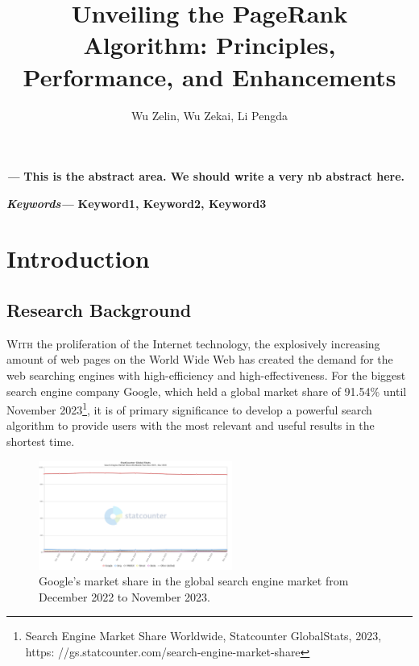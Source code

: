 \documentclass[lettersize,journal,12pt]{IEEEtran}
\renewenvironment{abstract}
{\fontsize{12}{14}\textit{\textbf{\abstractname---}}\bfseries\ignorespaces}
{}
\renewenvironment{IEEEkeywords}
{\fontsize{12}{14}\textit{\textbf{Keywords---}}\bfseries\ignorespaces}{}
\begin{document}
\onehalfspacing
\title{Unveiling the PageRank Algorithm: Principles, Performance, and Enhancements}
\author{Wu Zelin, Wu Zekai, Li Pengda}

\maketitle\thispagestyle{headings}
%

\begin{abstract}
	This is the abstract area. We should write a very nb abstract here.
\end{abstract}

\begin{IEEEkeywords}
	Keyword1, Keyword2, Keyword3
\end{IEEEkeywords}


\section{Introduction}

\subsection{Research Background}

\lettrine{W}{ith} 
the proliferation of the Internet technology, the explosively increasing amount of web pages on the World Wide Web has created the demand for the web searching engines with high-efficiency and high-effectiveness. 
For the biggest search engine company Google, which held a global market share of 91.54\% until November 2023\footnote[1]{Search Engine Market Share Worldwide, Statcounter GlobalStats, 2023, https:
//gs.statcounter.com/search-engine-market-share}, it is of primary significance to develop a powerful search algorithm to provide users with the most relevant and useful results in the shortest time. 

\begin{figure}[h]
    \centering
    \includegraphics[width=2.5in]{images/fig2.png}
    \caption{Google's market share in the global search engine market from December 2022 to November 2023.}
    \label{fig1}
\end{figure}
\end{document}
